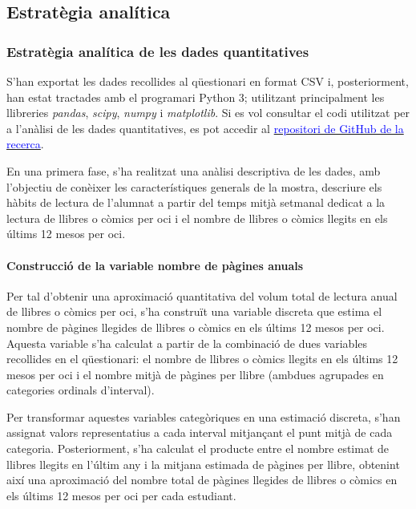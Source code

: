 \documentclass[12pt]{article}
\begin{document}
\subsection{Estratègia analítica}
\subsubsection{Estratègia analítica de les dades quantitatives}

S'han exportat les dades recollides al qüestionari en format CSV i, posteriorment, han estat tractades amb el programari Python 3; utilitzant principalment les llibreries \emph{pandas}, \emph{scipy}, \emph{numpy} i \emph{matplotlib}. Si es vol consultar el codi utilitzat per a l'anàlisi de les dades quantitatives, es pot accedir al \href{https://github.com/titocampis/tfm-habits-lectura.git}{\textcolor{blue}{repositori de GitHub de la recerca}}.

En una primera fase, s'ha realitzat una anàlisi descriptiva de les dades, amb l'objectiu de conèixer les característiques generals de la mostra, descriure els hàbits de lectura de l'alumnat a partir del temps mitjà setmanal dedicat a la lectura de llibres o còmics per oci i el nombre de llibres o còmics llegits en els últims 12 mesos per oci.

\paragraph{Construcció de la variable nombre de pàgines anuals}

Per tal d’obtenir una aproximació quantitativa del volum total de lectura anual de llibres o còmics per oci, s’ha construït una variable discreta que estima el nombre de pàgines llegides de llibres o còmics en els últims 12 mesos per oci. Aquesta variable s’ha calculat a partir de la combinació de dues variables recollides en el qüestionari: el nombre de llibres o còmics llegits en els últims 12 mesos per oci i el nombre mitjà de pàgines per llibre (ambdues agrupades en categories ordinals d'interval).

Per transformar aquestes variables categòriques en una estimació discreta, s’han assignat valors representatius a cada interval mitjançant el punt mitjà de cada categoria. Posteriorment, s’ha calculat el producte entre el nombre estimat de llibres llegits en l'últim any i la mitjana estimada de pàgines per llibre, obtenint així una aproximació del nombre total de pàgines llegides de llibres o còmics en els últims 12 mesos per oci per cada estudiant.
\end{document}
